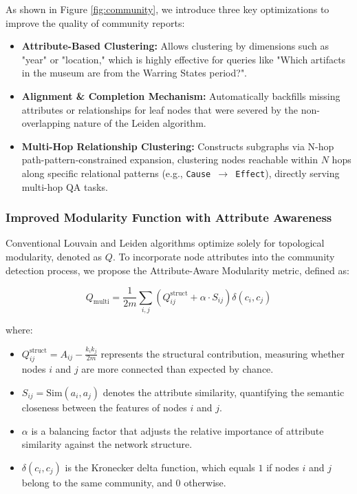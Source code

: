\documentclass[11pt]{article}
\begin{document}
As shown in Figure \ref{fig:community}, we introduce three key optimizations to improve the quality of community reports:

\begin{itemize}
    \item \textbf{Attribute-Based Clustering:} Allows clustering by dimensions such as "year" or "location," which is highly effective for queries like "Which artifacts in the museum are from the Warring States period?".

    \item \textbf{Alignment \& Completion Mechanism:} Automatically backfills missing attributes or relationships for leaf nodes that were severed by the non-overlapping nature of the Leiden algorithm.

    \item \textbf{Multi-Hop Relationship Clustering:} Constructs subgraphs via N-hop path-pattern-constrained expansion, clustering nodes reachable within $N$ hops along specific relational patterns (e.g., \texttt{Cause $\to$ Effect}), directly serving multi-hop QA tasks.

\end{itemize}

\subsubsection{Improved Modularity Function with Attribute Awareness}

Conventional Louvain and Leiden algorithms optimize solely for topological modularity, denoted as $Q$. To incorporate node attributes into the community detection process, we propose the Attribute-Aware Modularity metric, defined as:

\begin{center}
\small
\begin{equation}
    Q_{\text{multi}} = \frac{1}{2m} \sum_{i,j} \left( Q_{ij}^{\text{struct}} + \alpha \cdot S_{ij} \right) \delta(c_i, c_j)
    \label{eq:compact_modularity}
\end{equation}
\normalsize
\end{center}

\noindent where:
\begin{itemize}
    \item $Q_{ij}^{\text{struct}} = A_{ij} - \frac{k_i k_j}{2m}$ represents the structural contribution, measuring whether nodes $i$ and $j$ are more connected than expected by chance.
    \item $S_{ij} = \text{Sim}(a_i, a_j)$ denotes the attribute similarity, quantifying the semantic closeness between the features of nodes $i$ and $j$.
    \item $\alpha$ is a balancing factor that adjusts the relative importance of attribute similarity against the network structure.
    \item $\delta(c_i, c_j)$ is the Kronecker delta function, which equals $1$ if nodes $i$ and $j$ belong to the same community, and $0$ otherwise.
\end{itemize}
\end{document}
